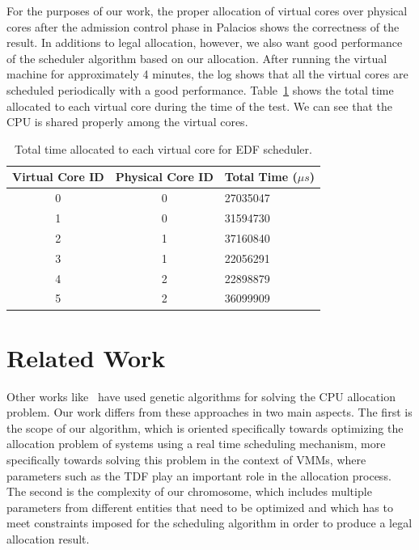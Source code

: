 \documentclass[11pt]{article}
\begin{document}
For the purposes of our work, the proper allocation of virtual cores over physical cores after the admission control phase in Palacios shows the correctness of the result. In additions to legal allocation, however, we also want good performance of the scheduler algorithm based on our allocation. After running the virtual machine for approximately 4 minutes, the log shows that all the virtual cores are scheduled periodically with a good performance. Table~\ref{tab:table2} shows the total time allocated to each virtual core during the time of the test. We can see that the CPU is shared properly among the virtual cores.

\begin{table}[H]
\centering
\renewcommand{\arraystretch}{1.2}

 \begin{tabularx}{275pt}{ | c | c | X | }
 \hline
Virtual Core ID & Physical Core ID & Total Time ($\mu$$s$) \\ \hline

0 & 0 & 27035047 \\ \hline

1 & 0 & 31594730 \\ \hline

2 & 1 & 37160840 \\ \hline

3 & 1 & 22056291 \\ \hline

4 & 2 & 22898879 \\ \hline

5 & 2 & 36099909 \\ \hline

\end{tabularx}
\caption{Total time allocated to each virtual core for EDF scheduler.}
 \label{tab:table2}
\end{table}

\section{Related Work}

Other works like~\cite{Shahid94,Wu04anincremental,Omara2010} have used genetic algorithms for solving the CPU allocation problem. Our work differs from these approaches in two main aspects. The first is the scope of our algorithm, which is oriented specifically towards optimizing the allocation problem of systems using a real time scheduling mechanism, more specifically towards solving this problem in the context of VMMs, where parameters such as the TDF play an important role in the allocation process. The second is the complexity of our chromosome, which includes multiple parameters from different entities that need to be optimized and which has to meet constraints imposed for the scheduling algorithm in order to produce a legal allocation result.
\end{document}
